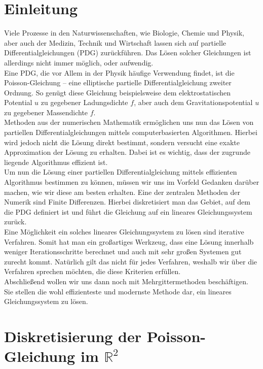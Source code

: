\chapter{Einleitung}\label{c.Einleitung}

Viele Prozesse in den Naturwissenschaften, wie Biologie, Chemie und Physik, aber auch der Medizin, Technik und Wirtschaft lassen sich auf partielle Differentialgleichungen (PDG) zurückführen. Das Lösen solcher Gleichungen ist allerdings nicht immer möglich, oder aufwendig. \\
Eine PDG, die vor Allem in der Physik häufige Verwendung findet, ist die Poisson-Gleichung – eine elliptische partielle Differentialgleichung zweiter Ordnung. So genügt diese Gleichung beispielsweise dem elektrostatischen Potential $u$ zu gegebener Ladungsdichte $f$, aber auch dem Gravitationspotential $u$ zu gegebener Massendichte $f$. \\
Methoden aus der numerischen Mathematik ermöglichen uns nun das Lösen von partiellen Differentialgleichungen mittels computerbasierten Algorithmen. Hierbei wird jedoch nicht die Lösung direkt bestimmt, sondern versucht eine exakte Approximation der Lösung zu erhalten. Dabei ist es wichtig, dass der zugrunde liegende Algorithmus effizient ist. \\
Um nun die Lösung einer partiellen Differentialgleichung mittels effizienten Algorithmus bestimmen zu können, müssen wir uns im Vorfeld Gedanken darüber machen, wie wir diese am besten erhalten. Eine der zentralen Methoden der Numerik sind Finite Differenzen. Hierbei diskretisiert man das Gebiet, auf dem die PDG definiert ist und führt die Gleichung auf ein lineares Gleichungssystem zurück. \\
Eine Möglichkeit ein solches lineares Gleichungssystem zu lösen sind iterative Verfahren. Somit hat man ein großartiges Werkzeug, dass eine Lösung innerhalb weniger Iterationsschritte berechnet und auch mit sehr großen Systemen gut zurecht kommt. Natürlich gilt das nicht für jedes Verfahren, weshalb wir über die Verfahren sprechen möchten, die diese Kriterien erfüllen. \\
Abschließend wollen wir uns dann noch mit Mehrgittermethoden beschäftigen. Sie stellen die wohl effizienteste und modernste Methode dar, ein lineares Gleichungssystem zu lösen.


\chapter{Diskretisierung der Poisson-Gleichung im $\mathbb{R}^{2}$}\label{c.Diskretisierte Poisson-Gleichung}

